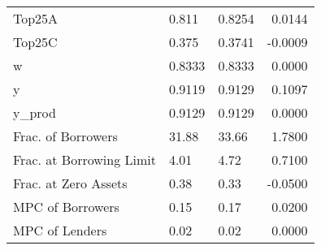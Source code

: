 \begin{table}
\begin{tabular}{lllr}
                  Top25A &   0.811 &   0.8254 &  0.0144 \\
                  Top25C &   0.375 &   0.3741 & -0.0009 \\
                       w &  0.8333 &   0.8333 &  0.0000 \\
                       y &  0.9119 &   0.9129 &  0.1097 \\
                  y\_prod &  0.9129 &   0.9129 &  0.0000 \\
      Frac. of Borrowers &   31.88 &    33.66 &  1.7800 \\
Frac. at Borrowing Limit &    4.01 &     4.72 &  0.7100 \\
    Frac. at Zero Assets &    0.38 &     0.33 & -0.0500 \\
        MPC of Borrowers &    0.15 &     0.17 &  0.0200 \\
          MPC of Lenders &    0.02 &     0.02 &  0.0000 \\
\bottomrule
\end{tabular}
\end{table}
